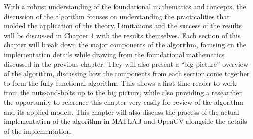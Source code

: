 %
%
%
%
%
%
%
%
%

%
%
%



With a robust understanding of the foundational mathematics and concepts, the discussion of the algorithm focuses on understanding the practicalities that molded the application of the theory. Limitations and the success of the results will be discussed in Chapter 4 with the results themselves. Each section of this chapter will break down the major components of the algorithm, focusing on the implementation details while drawing from the foundational mathematics discussed in the previous chapter. They will also present a ``big picture'' overview of the algorithm, discussing how the components from each section come together to form the fully functional algorithm. This allows a first-time reader to work from the nuts-and-bolts up to the big picture, while also providing a researcher the opportunity to reference this chapter very easily for review of the algorithm and its applied models. This chapter will also discuss the process of the actual implementation of the algorithm in MATLAB\textsuperscript{\textregistered} and OpenCV alongside the details of the implementation.



